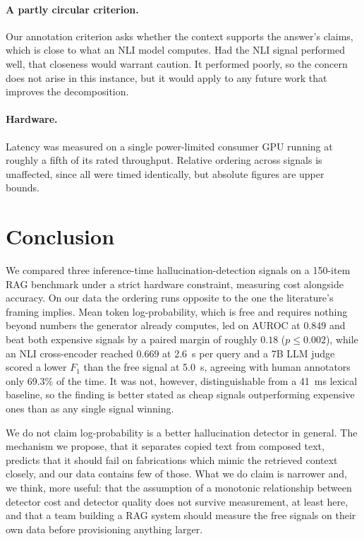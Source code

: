 \documentclass[11pt,a4paper]{article}
\begin{document}
\paragraph{A partly circular criterion.}
Our annotation criterion asks whether the context supports the answer's claims,
which is close to what an NLI model computes. Had the NLI signal performed well,
that closeness would warrant caution. It performed poorly, so the concern does
not arise in this instance, but it would apply to any future work that improves
the decomposition.

\paragraph{Hardware.}
Latency was measured on a single power-limited consumer GPU running at roughly a
fifth of its rated throughput. Relative ordering across signals is unaffected,
since all were timed identically, but absolute figures are upper bounds.

\section{Conclusion}

We compared three inference-time hallucination-detection signals on a
150-item RAG benchmark under a strict hardware constraint, measuring cost
alongside accuracy. On our data the ordering runs opposite to the one the
literature's framing implies. Mean token log-probability, which is free and requires
nothing beyond numbers the generator already computes, led on AUROC at $0.849$
and beat both expensive signals by a paired margin of roughly $0.18$
($p \le 0.002$), while an NLI cross-encoder reached
$0.669$ at \SI{2.6}{\second} per query and a 7B LLM judge scored a lower $F_1$
than the free signal at \SI{5.0}{\second}, agreeing with human annotators only
69.3\% of the time. It was not, however, distinguishable from a
\SI{41}{\milli\second} lexical baseline, so the finding is better stated as
cheap signals outperforming expensive ones than as any single signal winning.

We do not claim log-probability is a better hallucination detector in general.
The mechanism we propose, that it separates copied text from composed
text, predicts that it should fail on fabrications which mimic the retrieved
context closely, and our data contains few of those. What we do claim is
narrower and, we think, more useful: that the assumption of a monotonic
relationship between detector cost and detector quality does not survive
measurement, at least here, and that a team building a RAG system should
measure the free signals on their own data before provisioning anything larger.
\end{document}
